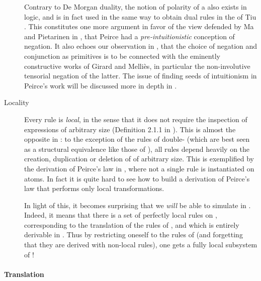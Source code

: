 \begin{scope}
\begin{description}
    \begin{remark}
      
    Contrary to De Morgan duality, the notion of polarity of a  also
    exists in  logic, and is in fact used in the same way to
    obtain dual rules in the    of
    Tiu \cite{tiu_local_2006}. This constitutes one more argument in favor of
    the view defended by Ma and Pietarinen in ,
    that Peirce had a \emph{pre-intuitionistic} conception of negation. It also
    echoes our observation in , that the choice of
    negation and conjunction as primitives is to be connected with the eminently
    constructive works of Girard and Melliès, in particular the non-involutive
    tensorial negation of the latter. The issue of finding seeds of intuitionism
    in Peirce's work will be discussed more in depth in .
    \end{remark}

  \item[Locality]
    Every rule is \emph{local}, in the sense that it does not require the
    inspection of expressions of arbitrary size (Definition 2.1.1 in
    \cite{tubella:hal-02390267}). This is almost the opposite in : to
    the exception of the rules of double- (which are best seen as a
    structural equivalence like those of ), all rules depend heavily on the
    creation, duplication or deletion of  of arbitrary size. This is
    exemplified by the derivation of Peirce's law in ,
    where not a single rule is instantiated on atoms. In fact it is quite hard
    to see how to build a derivation of Peirce's law that performs only local
    transformations.
    
    In light of this, it becomes surprising that we \emph{will} be able to
    simulate  in . Indeed, it means that there is a set
     of perfectly local rules on , corresponding to the
    translation of the rules of , and which is entirely derivable in
    . Thus by restricting oneself to the rules of 
    (and forgetting that they are derived with non-local rules), one gets a
    fully local subsystem of !
\end{description}

\paragraph{Translation}


\end{scope}
